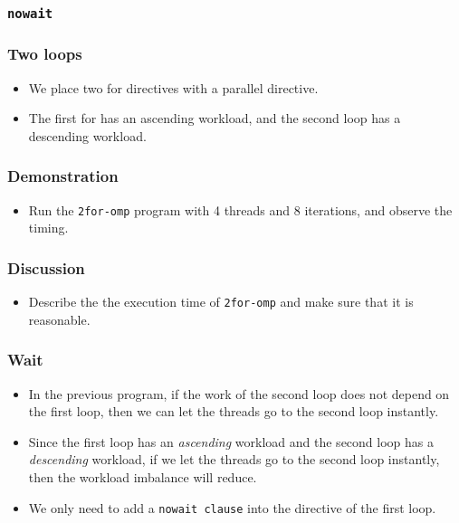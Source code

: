 \documentclass{beamer}
\begin{document}
\begin{frame}
\frametitle{\tt nowait}
\end{frame}

\begin{frame}
\frametitle{Two loops}
\begin{itemize}
\item We place two for directives with a parallel directive.
\item The first for has an ascending workload, and the second loop has
a descending workload. 
\end{itemize}
\end{frame}


\begin{frame}
  \frametitle{Demonstration}
  \begin{itemize}
  \item Run the {\tt 2for-omp} program with 4 threads and 8
    iterations, and observe the timing.
  \end{itemize}
\end{frame}

\begin{frame}
  \frametitle{Discussion}
  \begin{itemize}
  \item Describe the the execution time of {\tt 2for-omp} and make
    sure that it is reasonable.
  \end{itemize}
\end{frame}

\begin{frame}
\frametitle{Wait}
\begin{itemize}
\item In the previous program, if the work of the second loop does not depend on the first loop, then we can let the threads go to the second loop instantly.
\item Since the first loop has an {\em ascending} workload and the second loop has a {\em descending} workload, if we let the threads go to the second loop instantly, then the workload imbalance will reduce.
\item We only need to add a {\tt nowait clause} into the directive of the first loop.
\end{itemize}
\end{frame}

\begin{frame}
\end{frame}
\end{document}
